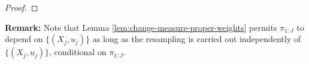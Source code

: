 \begin{proof}
    
    
\end{proof}


\noindent \textbf{Remark:} Note that Lemma \ref{lem:change-measure-proper-weights} permits $\pi_{1:J}$ to depend on $\{(X_j,u_j)\}$ as long as the resampling is carried out independently of $\{(X_j,u_j)\}$, conditional on $\pi_{1:J}$.

